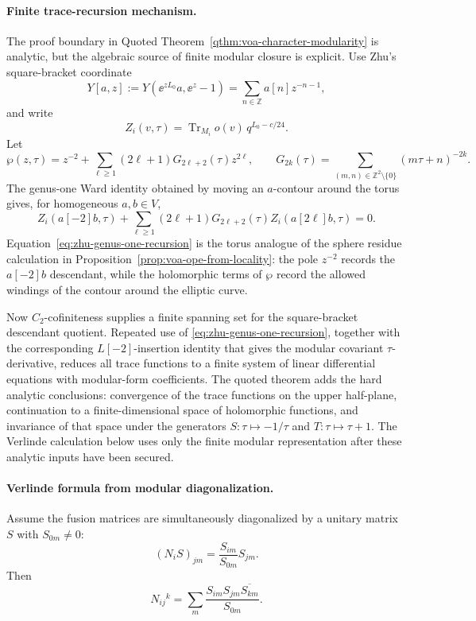 \paragraph{Finite trace-recursion mechanism.}
The proof boundary in Quoted Theorem~\ref{qthm:voa-character-modularity} is
analytic, but the algebraic source of finite modular closure is explicit.
Use Zhu's square-bracket coordinate
\begin{equation}
  Y[a,z]:=Y(\ee^{zL_0}a,\ee^z-1)
  =
  \sum_{n\in\mathbb Z}a[n]z^{-n-1},
  \label{eq:zhu-square-bracket-vertex-operator}
\end{equation}
and write
\[
  Z_i(v,\tau)=
  \operatorname{Tr}_{M_i}o(v)\,q^{L_0-c/24}.
\]
Let
\begin{equation}
  \wp(z,\tau)
  =
  z^{-2}
  +\sum_{\ell\ge1}(2\ell+1)G_{2\ell+2}(\tau)z^{2\ell},
  \qquad
  G_{2k}(\tau)=
  \sum_{(m,n)\in\mathbb Z^2\setminus\{0\}}(m\tau+n)^{-2k}.
  \label{eq:zhu-weierstrass-kernel}
\end{equation}
The genus-one Ward identity obtained by moving an \(a\)-contour around the
torus gives, for homogeneous \(a,b\in V\),
\begin{equation}
  Z_i(a[-2]b,\tau)
  +
  \sum_{\ell\ge1}(2\ell+1)G_{2\ell+2}(\tau)
  Z_i(a[2\ell]b,\tau)
  =
  0.
  \label{eq:zhu-genus-one-recursion}
\end{equation}
Equation~\eqref{eq:zhu-genus-one-recursion} is the torus analogue of the
sphere residue calculation in Proposition~\ref{prop:voa-ope-from-locality}:
the pole \(z^{-2}\) records the \(a[-2]b\) descendant, while the holomorphic
terms of \(\wp\) record the allowed windings of the contour around the
elliptic curve.

Now \(C_2\)-cofiniteness supplies a finite spanning set for the square-bracket
descendant quotient.  Repeated use of
\eqref{eq:zhu-genus-one-recursion}, together with the corresponding
\(L[-2]\)-insertion identity that gives the modular covariant
\(\tau\)-derivative, reduces all trace functions to a finite system of
linear differential equations with modular-form coefficients.  The quoted
theorem adds the hard analytic conclusions: convergence of the trace
functions on the upper half-plane, continuation to a finite-dimensional
space of holomorphic functions, and invariance of that space under the
generators \(S:\tau\mapsto-1/\tau\) and \(T:\tau\mapsto\tau+1\).  The
Verlinde calculation below uses only the finite modular representation after
these analytic inputs have been secured.

\paragraph{Verlinde formula from modular diagonalization.}
Assume the fusion matrices are simultaneously diagonalized by a unitary
matrix \(S\) with \(S_{0m}\ne0\):
\begin{equation}
  (N_i S)_{jm}
  =
  \frac{S_{im}}{S_{0m}}S_{jm}.
  \label{eq:fusion-diagonalization-by-s}
\end{equation}
Then
\begin{equation}
  N_{ij}{}^k
  =
  \sum_m
  \frac{S_{im}S_{jm}\overline{S_{km}}}{S_{0m}} .
  \label{eq:verlinde-formula}
\end{equation}

